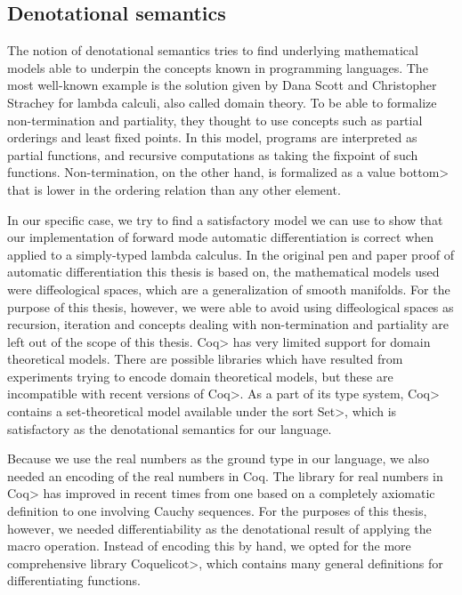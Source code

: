 \subsection{Denotational semantics}

The notion of denotational semantics tries to find underlying mathematical models able to underpin the concepts known in programming languages. The most well-known example is the solution given by Dana Scott and Christopher Strachey\cite{Scott1977} for lambda calculi, also called domain theory.
To be able to formalize non-termination and partiality, they thought to use concepts such as partial orderings and least fixed points\cite{aaby2020}.
In this model, programs are interpreted as partial functions, and recursive computations as taking the fixpoint of such functions.
Non-termination, on the other hand, is formalized as a value \<bottom> that is lower in the ordering relation than any other element.

In our specific case, we try to find a satisfactory model we can use to show that our implementation of forward mode automatic differentiation is correct when applied to a simply-typed lambda calculus.
In the original pen and paper proof of automatic differentiation this thesis is based on, the mathematical models used were diffeological spaces, which are a generalization of smooth manifolds.
For the purpose of this thesis, however, we were able to avoid using diffeological spaces as recursion, iteration and concepts dealing with non-termination and partiality are left out of the scope of this thesis.
\<Coq> has very limited support for domain theoretical models.
There are possible libraries which have resulted from experiments trying to encode domain theoretical models\cite{Benton2009}\cite{Dockins2014}, but these are incompatible with recent versions of \<Coq>.
As a part of its type system, \<Coq> contains a set-theoretical model available under the sort \<Set>, which is satisfactory as the denotational semantics for our language.

Because we use the real numbers as the ground type in our language, we also needed an encoding of the real numbers in Coq. The library for real numbers in \<Coq> has improved in recent times from one based on a completely axiomatic definition to one involving Cauchy sequences. For the purposes of this thesis, however, we needed differentiability as the denotational result of applying the macro operation. Instead of encoding this by hand, we opted for the more comprehensive library \<Coquelicot>\cite{Boldo2015CoquelicotAU}, which contains many general definitions for differentiating functions.
